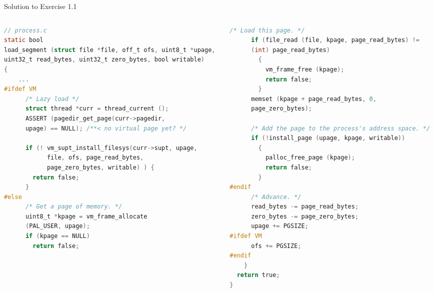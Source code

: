 \documentclass[10pt]{beamer}
\begin{document}
\begin{frame}[fragile]{Solution to Exercise 1.1}
\begin{columns}
\begin{column}{0.5\textwidth}
\begin{lstlisting}[language=C]
// process.c
static bool
load_segment (struct file *file, off_t ofs, uint8_t *upage,
uint32_t read_bytes, uint32_t zero_bytes, bool writable) 
{
    ...
#ifdef VM
      /* Lazy load */
      struct thread *curr = thread_current ();
      ASSERT (pagedir_get_page(curr->pagedir,
      upage) == NULL); /**< no virtual page yet? */

      if (! vm_supt_install_filesys(curr->supt, upage,
            file, ofs, page_read_bytes, 
            page_zero_bytes, writable) ) {
        return false;
      }
#else
      /* Get a page of memory. */
      uint8_t *kpage = vm_frame_allocate
      (PAL_USER, upage);
      if (kpage == NULL)
        return false;
\end{lstlisting}
\end{column}
\begin{column}{0.5\textwidth}
\begin{lstlisting}[language=C]
      /* Load this page. */
      if (file_read (file, kpage, page_read_bytes) != 
      (int) page_read_bytes)
        {
          vm_frame_free (kpage);
          return false; 
        }
      memset (kpage + page_read_bytes, 0,
      page_zero_bytes);

      /* Add the page to the process's address space. */
      if (!install_page (upage, kpage, writable)) 
        {
          palloc_free_page (kpage);
          return false; 
        }
#endif
      /* Advance. */
      read_bytes -= page_read_bytes;
      zero_bytes -= page_zero_bytes;
      upage += PGSIZE;
#ifdef VM
      ofs += PGSIZE;
#endif
    }
  return true;
}
\end{lstlisting}
\end{column}
\end{columns}
\end{frame}
\end{document}
